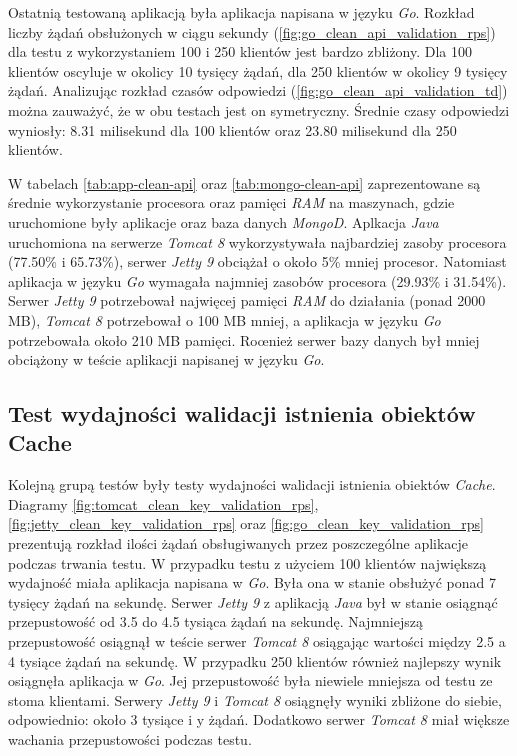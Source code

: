 Ostatnią testowaną aplikacją była aplikacja napisana w języku \textsl{Go}. Rozkład liczby żądań obsłużonych w ciągu sekundy (\ref{fig:go_clean_api_validation_rps}) dla testu z wykorzystaniem 100 i 250 klientów jest bardzo zbliżony. Dla 100 klientów oscyluje w okolicy 10 tysięcy żądań, dla 250 klientów w okolicy 9 tysięcy żądań. Analizując rozkład czasów odpowiedzi (\ref{fig:go_clean_api_validation_td}) można zauważyć, że w obu testach jest on symetryczny. Średnie czasy odpowiedzi wyniosły: 8.31 milisekund dla 100 klientów oraz 23.80 milisekund dla 250 klientów.

W tabelach \ref{tab:app-clean-api} oraz \ref{tab:mongo-clean-api} zaprezentowane są średnie wykorzystanie procesora oraz pamięci \textsl{RAM} na maszynach, gdzie uruchomione były aplikacje oraz baza danych \textsl{MongoD}. Aplkacja \textsl{Java} uruchomiona na serwerze \textsl{Tomcat 8} wykorzystywała najbardziej zasoby procesora (77.50\% i 65.73\%), serwer \textsl{Jetty 9} obciążał o około 5\% mniej procesor. Natomiast aplikacja w języku \textsl{Go} wymagała najmniej zasobów procesora (29.93\% i 31.54\%). Serwer \textsl{Jetty 9} potrzebował najwięcej pamięci \textsl{RAM} do działania (ponad 2000 MB), \textsl{Tomcat 8} potrzebował o 100 MB mniej, a aplikacja w języku \textsl{Go} potrzebowała około 210 MB pamięci. Roœnież serwer bazy danych był mniej obciążony w teście aplikacji napisanej w języku \textsl{Go}.

% 
% 
\clearpage

\subsection{Test wydajności walidacji istnienia obiektów Cache}
Kolejną grupą testów były testy wydajności walidacji istnienia obiektów \textsl{Cache}. Diagramy \ref{fig:tomcat_clean_key_validation_rps},  \ref{fig:jetty_clean_key_validation_rps} oraz  \ref{fig:go_clean_key_validation_rps} prezentują rozkład ilości żądań obsługiwanych przez poszczególne aplikacje podczas trwania testu. W przypadku testu z użyciem 100 klientów największą wydajność miała aplikacja napisana w \textsl{Go}. Była ona w stanie obsłużyć ponad 7 tysięcy żądań na sekundę. Serwer \textsl{Jetty 9} z aplikacją \textsl{Java} był w stanie osiągnąć przepustowość od 3.5 do 4.5 tysiąca żądań na sekundę. Najmniejszą przepustowość osiągnął w teście serwer \textsl{Tomcat 8} osiągając wartości między 2.5 a 4 tysiące żądań na sekundę. W przypadku 250 klientów również najlepszy wynik osiągnęła aplikacja w \textsl{Go}. Jej przepustowość była niewiele mniejsza od testu ze stoma klientami. Serwery \textsl{Jetty 9} i \textsl{Tomcat 8} osiągnęły wyniki zbliżone do siebie, odpowiednio: około 3 tysiące i y żądań. Dodatkowo serwer \textsl{Tomcat 8} miał większe wachania przepustowości podczas testu.

